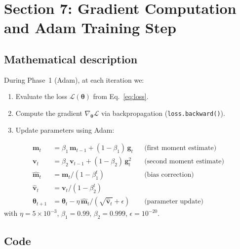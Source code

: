 \documentclass[11pt,a4paper]{article}
\begin{document}
\section{Section 7: Gradient Computation and Adam Training Step}
\label{sec:adam_step}

\subsection*{Mathematical description}

During Phase~1 (Adam), at each iteration we:

\begin{enumerate}[nosep]
  \item Evaluate the loss $\mathcal{L}(\bm\theta)$ from Eq.~\eqref{eq:loss}.
  \item Compute the gradient $\nabla_{\bm\theta} \mathcal{L}$ via
        backpropagation (\texttt{loss.backward()}).
  \item Update parameters using Adam:
\end{enumerate}

\begin{align}
  \bm{m}_t &= \beta_1\,\bm{m}_{t-1} + (1-\beta_1)\,\bm{g}_t
    & &\text{(first moment estimate)} \\
  \bm{v}_t &= \beta_2\,\bm{v}_{t-1} + (1-\beta_2)\,\bm{g}_t^2
    & &\text{(second moment estimate)} \\
  \hat{\bm{m}}_t &= \bm{m}_t / (1-\beta_1^t)
    & &\text{(bias correction)} \\
  \hat{\bm{v}}_t &= \bm{v}_t / (1-\beta_2^t) \\
  \bm\theta_{t+1} &= \bm\theta_t
    - \eta\,\hat{\bm{m}}_t / (\sqrt{\hat{\bm{v}}_t} + \epsilon)
    & &\text{(parameter update)}
\label{eq:adam}
\end{align}
with $\eta = 5\times 10^{-3}$, $\beta_1 = 0.99$, $\beta_2 = 0.999$,
$\epsilon = 10^{-20}$.

\subsection*{Code}
\end{document}
